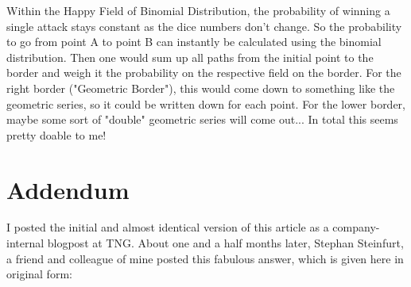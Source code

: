 \documentclass[11pt,a4paper]{article}
\begin{document}
    Within the Happy Field of Binomial Distribution, the probability of winning a single attack stays constant as the dice numbers don't change.
    So the probability to go from point A to point B can instantly be calculated using the binomial distribution.
    Then one would sum up all paths from the initial point to the border and weigh it the probability on the respective field on the border.
    For the right border ("Geometric Border"), this would come down to something like the geometric series, so it could be written down for each point.
    For the lower border, maybe some sort of "double" geometric series will come out... In total this seems pretty doable to me!


    \section{Addendum}
    I posted the initial and almost identical version of this article as a company-internal blogpost at TNG.
    About one and a half months later, Stephan Steinfurt, a friend and colleague of mine posted this fabulous answer, which is given here in original form:\\
\end{document}
